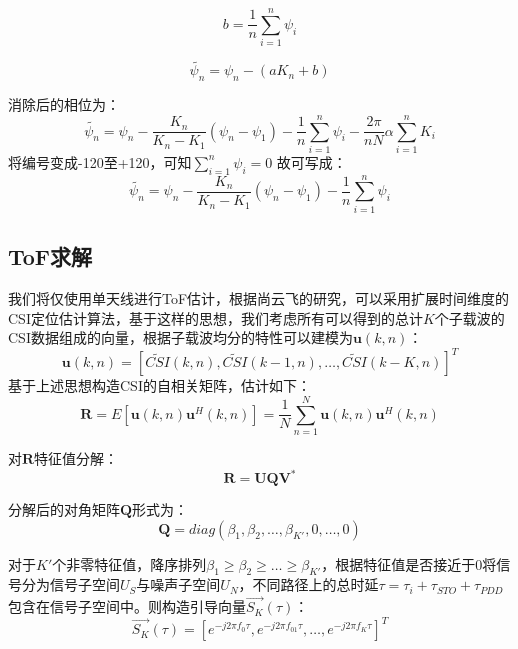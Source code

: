 \documentclass[withoutpreface,bwprint]{cumcmthesis}
\begin{document}
\begin{equation}
    b=\frac{1}{n}\sum_{i=1}^{n}\psi_i
\end{equation}

\begin{equation}
    \widetilde{\psi_n}=\psi_n-(aK_n+b)
\end{equation}

消除后的相位为：
\begin{equation}
    \widetilde{\psi_n}=\psi_n-\frac{K_n}{K_n-K_1}(\psi_n-\psi_1)-\frac{1}{n}\sum_{i=1}^{n}\psi_i-\frac{2\pi}{nN}\alpha\sum_{i=1}^{n}K_i
\end{equation}
将编号变成-120至+120，可知$\sum_{i=1}^{n}\psi_i=0$
故可写成：
\begin{equation}
    \widetilde{\psi_n}=\psi_n-\frac{K_n}{K_n-K_1}(\psi_n-\psi_1)-\frac{1}{n}\sum_{i=1}^{n}\psi_i
\end{equation}


\subsection{ToF求解}
我们将仅使用单天线进行ToF估计，根据尚云飞的研究，可以采用扩展时间维度的CSI定位估计算法，基于这样的思想，我们考虑所有可以得到的总计$K$个子载波的CSI数据组成的向量，根据子载波均分的特性可以建模为$\textbf{u}(k,n)$：
\begin{equation}
    \textbf{u}(k,n)=[\widetilde{CSI}(k,n),\widetilde{CSI}(k-1,n),\dots,\widetilde{CSI}(k-K,n)]^T
\end{equation}
基于上述思想构造CSI的自相关矩阵，估计如下：
\begin{equation}
    \textbf{R}=E[\textbf{u}(k,n)\textbf{u}^{H}(k,n)]=\frac{1}{N}\sum^N_{n=1}\textbf{u}(k,n)\textbf{u}^{H}(k,n)
\end{equation}

对$\textbf{R}$特征值分解：
\begin{equation}
    \textbf{R}=\textbf{UQV}^{*}
\end{equation}

分解后的对角矩阵$\textbf{Q}$形式为：
\begin{equation}
\textbf{Q}=diag(\beta_1,\beta_2,\dots,\beta_{K'},0,\dots,0)
\end{equation}

对于$K'$个非零特征值，降序排列$\beta_1\geq\beta_2\geq\dots\geq\beta_{K'}$，根据特征值是否接近于0将信号分为信号子空间$U_S$与噪声子空间$U_N$，不同路径上的总时延$\tau=\tau_i+\tau_{STO}+\tau_{PDD}$包含在信号子空间中。则构造引导向量$\vec{S_K}(\tau)$：
\begin{equation}
    \vec{S_K}(\tau)=[e^{-j2\pi f_0\tau},e^{-j2\pi f_01\tau},\dots,e^{-j2\pi f_K\tau}]^T
\end{equation}
\end{document}
